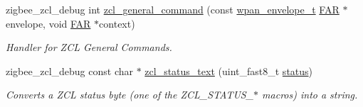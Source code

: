\begin{DoxyCompactItemize}
zigbee\+\_\+zcl\+\_\+debug int \hyperlink{group__zcl_gac3849121e93e777ce9a7510d24517b9b}{zcl\+\_\+general\+\_\+command} (const \hyperlink{structwpan__envelope__t}{wpan\+\_\+envelope\+\_\+t} \hyperlink{group__hal_gaef060b3456fdcc093a7210a762d5f2ed}{F\+AR} $\ast$envelope, void \hyperlink{group__hal_gaef060b3456fdcc093a7210a762d5f2ed}{F\+AR} $\ast$context)
\begin{DoxyCompactList}\small\item\em Handler for Z\+CL General Commands. \end{DoxyCompactList}\item 
zigbee\+\_\+zcl\+\_\+debug const char $\ast$ \hyperlink{group__zcl_ga04c32f1b9f6c36fae06e9bed5bd8f7dd}{zcl\+\_\+status\+\_\+text} (uint\+\_\+fast8\+\_\+t \hyperlink{group__xbee__atcmd_gade818037fd6c985038ff29656089758d}{status})
\begin{DoxyCompactList}\small\item\em Converts a Z\+CL status byte (one of the Z\+C\+L\+\_\+\+S\+T\+A\+T\+U\+S\+\_\+$\ast$ macros) into a string. \end{DoxyCompactList}\end{DoxyCompactItemize}
